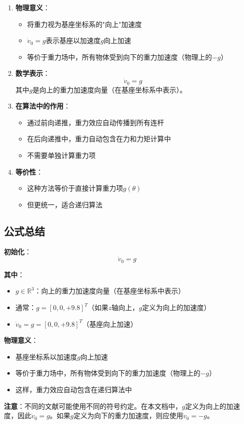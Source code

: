 \documentclass[12pt,a4paper]{article}
\begin{document}
\begin{enumerate}
\item \textbf{物理意义}：
\begin{itemize}
\item 将重力视为基座坐标系的"向上"加速度
\item $\dot{v}_0 = g$表示基座以加速度$g$向上加速
\item 等价于重力场中，所有物体受到向下的重力加速度（物理上的$-g$）
\end{itemize}

\item \textbf{数学表示}：
\begin{equation}
\dot{v}_0 = g
\end{equation}
其中$g$是向上的重力加速度向量（在基座坐标系中表示）。

\item \textbf{在算法中的作用}：
\begin{itemize}
\item 通过前向递推，重力效应自动传播到所有连杆
\item 在后向递推中，重力自动包含在力和力矩计算中
\item 不需要单独计算重力项
\end{itemize}

\item \textbf{等价性}：
\begin{itemize}
\item 这种方法等价于直接计算重力项$g(\theta)$
\item 但更统一，适合递归算法
\end{itemize}
\end{enumerate}

\subsection{公式总结}

\textbf{初始化}：
\begin{equation}
\dot{v}_0 = g \tag{14}
\end{equation}

\textbf{其中}：
\begin{itemize}
\item $g \in \mathbb{R}^3$：向上的重力加速度向量（在基座坐标系中表示）
\item 通常：$g = [0, 0, +9.8]^T$（如果$z$轴向上，$g$定义为向上的加速度）
\item $\dot{v}_0 = g = [0, 0, +9.8]^T$（基座向上加速）
\end{itemize}

\textbf{物理意义}：
\begin{itemize}
\item 基座坐标系以加速度$g$向上加速
\item 等价于重力场中，所有物体受到向下的重力加速度（物理上的$-g$）
\item 这样，重力效应自动包含在递归算法中
\end{itemize}

\textbf{注意}：不同的文献可能使用不同的符号约定。在本文档中，$g$定义为向上的加速度，因此$\dot{v}_0 = g$。如果$g$定义为向下的重力加速度，则应使用$\dot{v}_0 = -g$。
\end{document}
